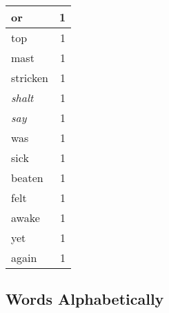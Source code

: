 \begin{center}
\begin{longtable}{l|r}
or & 1\\ \hline 
top & 1\\ \hline 
mast & 1\\ \hline 
stricken & 1\\ \hline 
\emph{shalt} & 1\\ \hline 
\emph{say} & 1\\ \hline 
was & 1\\ \hline 
sick & 1\\ \hline 
beaten & 1\\ \hline 
felt & 1\\ \hline 
awake & 1\\ \hline 
yet & 1\\ \hline 
again & 1\\ \hline 
\end{longtable}  
\end{center}  


  
\normalsize  

  
  


\subsection{Words Alphabetically}

